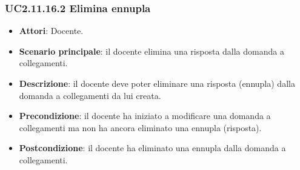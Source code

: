 \subsubsection{UC2.11.16.2 Elimina ennupla}
\begin{itemize}
\item \textbf{Attori}: Docente.
\item \textbf{Scenario principale}: il docente elimina una risposta dalla domanda a collegamenti.
\item \textbf{Descrizione}: il docente deve poter eliminare una risposta (ennupla) dalla domanda a collegamenti da lui creata.
\item \textbf{Precondizione}: il docente ha iniziato a modificare una domanda a collegamenti ma non ha ancora eliminato una ennupla (risposta).
\item \textbf{Postcondizione}: il docente ha eliminato una ennupla dalla domanda a collegamenti.
\end{itemize}
